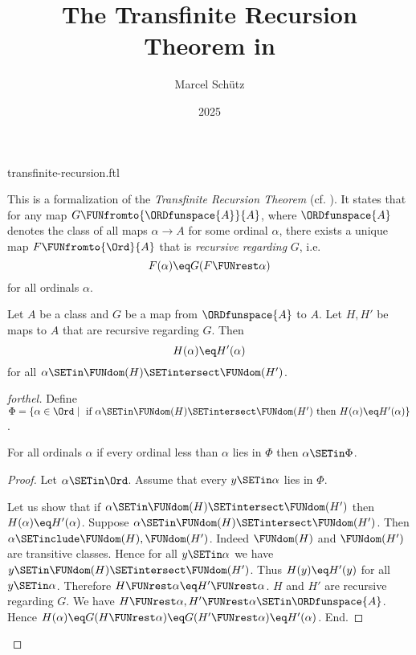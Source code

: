 \documentclass{stex}
\title{The Transfinite Recursion Theorem in \Naproche}
\author{Marcel Schütz}
\date{2025}
\begin{document}
\begin{smodule}{transfinite-recursion.ftl}
\maketitle


\noindent This is a formalization of the \emph{Transfinite Recursion Theorem}
(cf. \cite{Koepke2018}).
It states that for any map $G \FUNfromto{\ORDfunspace{A}}{A}$, where
$\ORDfunspace{A}$ denotes the class of all maps $\alpha \to A$ for some
ordinal $\alpha$, there exists a unique map $F \FUNfromto{\Ord}{A}$ that is
\emph{recursive regarding} $G$, i.e. \[F(\alpha) \eq G(F \FUNrest \alpha)\] for
all ordinals $\alpha$.

\begin{lemma}[forthel,title=Coincidence Lemma,id=transfinite_recursion_coincidence]
  Let $A$ be a class and $G$ be a map from $\ORDfunspace{A}$ to $A$.
  Let $H, H'$ be maps to $A$ that are recursive regarding $G$.
  Then \[ H(\alpha) \eq H'(\alpha) \] for all $\alpha \SETin \FUNdom(H) \SETintersect \FUNdom(H')$.
\end{lemma}
\begin{proof}[forthel]
  Define $\Phi = \{ \alpha \in \Ord \mid\text{ if }
  \alpha \SETin \FUNdom(H) \SETintersect \FUNdom(H')\text{ then }H(\alpha) \eq H'(\alpha) \}$.

  For all ordinals $\alpha$ if every ordinal less than $\alpha$ lies in $\Phi$ then $\alpha \SETin \Phi$.
  \begin{proof}
    Let $\alpha \SETin \Ord$.
    Assume that every $y \SETin \alpha$ lies in $\Phi$.

    Let us show that if $\alpha \SETin \FUNdom(H) \SETintersect \FUNdom(H')$ then
    $H(\alpha) \eq H'(\alpha)$.
      Suppose $\alpha \SETin \FUNdom(H) \SETintersect \FUNdom(H')$.
      Then $\alpha \SETinclude \FUNdom(H), \FUNdom(H')$.
      Indeed $\FUNdom(H)$ and $\FUNdom(H')$ are transitive classes.
      Hence for all $y \SETin \alpha$ we have $y \SETin \FUNdom(H) \SETintersect \FUNdom(H')$.
      Thus $H(y) \eq H'(y)$ for all $y \SETin \alpha$.
      Therefore $H \FUNrest \alpha \eq H' \FUNrest \alpha$.
      $H$ and $H'$ are recursive regarding $G$.
      We have $H \FUNrest \alpha, H' \FUNrest \alpha \SETin \ORDfunspace{A}$.
      Hence $H(\alpha)
        \eq G(H \FUNrest \alpha)
        \eq G(H' \FUNrest \alpha)
        \eq H'(\alpha)$.
    End.


\end{proof}
\end{proof}
\end{smodule}
\end{document}
